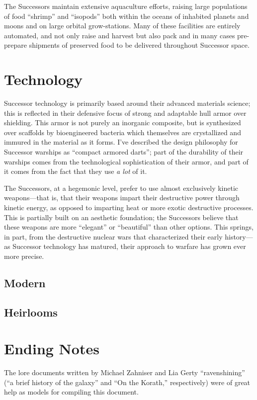 \documentclass[11pt]{report}
\begin{document}
    The Successors maintain extensive aquaculture efforts, raising large populations of food ``shrimp'' and ``isopods'' both within the oceans of inhabited planets and moons and on large orbital grow-stations. Many of these facilities are entirely automated, and not only raise and harvest but also pack and in many cases pre-prepare shipments of preserved food to be delivered throughout Successor space.
    
    \section{Technology}
    Successor technology is primarily based around their advanced materials science; this is reflected in their defensive focus of strong and adaptable hull armor over shielding. This armor is not purely an inorganic composite, but is synthesized over scaffolds by bioengineered bacteria which themselves are crystallized and immured in the material as it forms. I've described the design philosophy for Successor warships as ``compact armored darts''; part of the durability of their warships comes from the technological sophistication of their armor, and part of it comes from the fact that they use \emph{a lot} of it.

    The Successors, at a hegemonic level, prefer to use almost exclusively kinetic weapons---that is, that their weapons impart their destructive power through kinetic energy, as opposed to imparting heat or more exotic destructive processes. This is partially built on an aesthetic foundation; the Successors believe that these weapons are more ``elegant'' or ``beautiful'' than other options. This springs, in part, from the destructive nuclear wars that characterized their early history---as Successor technology has matured, their approach to warfare has grown ever more precise.

    \subsection{Modern}
    \subsection{Heirlooms}
    \section{Ending Notes}
    The lore documents written by Michael Zahniser and Lia Gerty ``ravenshining'' (``a brief history of the galaxy'' and ``On the Korath,'' respectively) were of great help as models for compiling this document.
\end{document}
